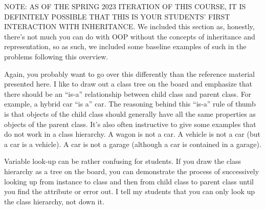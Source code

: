 \begin{meta}
NOTE: AS OF THE SPRING 2023 ITERATION OF THIS COURSE, IT IS DEFINITELY POSSIBLE THAT THIS IS YOUR STUDENTS' FIRST INTERACTION WITH INHERITANCE. We included this section as, honestly, there's not much you can do with OOP without the concepts of inheritance and representation, so as such, we included some baseline examples of such in the problems following this overview.

Again, you probably want to go over this differently than the reference material presented here. I like to draw out a class tree on the board and emphasize that there should be an ``is-a'' relationship between child class and parent class. For example, a hybrid car ``is a'' car. The reasoning behind this ``is-a'' rule of thumb is that objects of the child class should generally have all the same properties as objects of the parent class. It's also often instructive to give some examples that do not work in a class hierarchy. A wagon is not a car. A vehicle is not a car (but a car is a vehicle). A car is not a garage (although a car is contained in a garage). 

Variable look-up can be rather confusing for students. If you draw the class hierarchy as a tree on the board, you can demonstrate the process of successively looking up from instance to class and then from child class to parent class until you find the attribute or error out. I tell my students that you can only look up the class hierarchy, not down it. 
\end{meta}